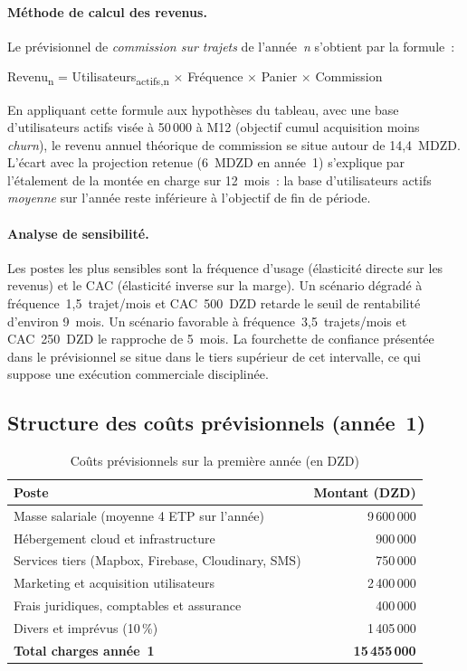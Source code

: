 \documentclass[12pt, a4paper, oneside]{report}
\begin{document}
\paragraph{Méthode de calcul des revenus.} Le prévisionnel de \textit{commission sur trajets} de l'année~\textit{n} s'obtient par la formule~:
\begin{center}
\small
Revenu\textsubscript{n} = Utilisateurs\textsubscript{actifs,n} $\times$ Fréquence $\times$ Panier $\times$ Commission
\end{center}

En appliquant cette formule aux hypothèses du tableau, avec une base d'utilisateurs actifs visée à 50\,000 à M12 (objectif cumul acquisition moins \textit{churn}), le revenu annuel théorique de commission se situe autour de 14,4~MDZD. L'écart avec la projection retenue (6~MDZD en année~1) s'explique par l'étalement de la montée en charge sur 12~mois~: la base d'utilisateurs actifs \textit{moyenne} sur l'année reste inférieure à l'objectif de fin de période.

\paragraph{Analyse de sensibilité.} Les postes les plus sensibles sont la fréquence d'usage (élasticité directe sur les revenus) et le CAC (élasticité inverse sur la marge). Un scénario dégradé à fréquence~1,5~trajet/mois et CAC~500~DZD retarde le seuil de rentabilité d'environ 9~mois. Un scénario favorable à fréquence~3,5~trajets/mois et CAC~250~DZD le rapproche de 5~mois. La fourchette de confiance présentée dans le prévisionnel se situe dans le tiers supérieur de cet intervalle, ce qui suppose une exécution commerciale disciplinée.

\subsection{Structure des coûts prévisionnels (année~1)}

\begin{table}[H]
\centering
\begin{tabularx}{\textwidth}{|X|r|}
\hline
\rowcolor{rohlight}
\textbf{Poste} & \textbf{Montant (DZD)} \\
\hline
Masse salariale (moyenne 4 ETP sur l'année) & 9\,600\,000 \\
\hline
Hébergement cloud et infrastructure & 900\,000 \\
\hline
Services tiers (Mapbox, Firebase, Cloudinary, SMS) & 750\,000 \\
\hline
Marketing et acquisition utilisateurs & 2\,400\,000 \\
\hline
Frais juridiques, comptables et assurance & 400\,000 \\
\hline
Divers et imprévus (10\,\%) & 1\,405\,000 \\
\hline
\rowcolor{rohlight}
\textbf{Total charges année~1} & \textbf{15\,455\,000} \\
\hline
\end{tabularx}
  \caption{Coûts prévisionnels sur la première année (en DZD)}
\end{table}
\end{document}
